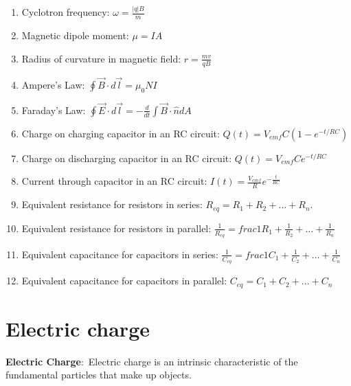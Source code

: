 \documentclass[nobib]{tufte-handout}
\newcommand{\defn}[2]{\noindent\textbf{#1}:\ #2}
\begin{document}
\begin{enumerate}
    \item Cyclotron frequency: $\omega = \frac{|q|B}{m}$
    \item Magnetic dipole moment: $\mu = IA$
    \item Radius of curvature in magnetic field: $r = \frac{mv}{qB}$
    \item Ampere's Law: $\oint \vec{B} \cdot d\vec{l} = \mu_0 NI$
    \item Faraday's Law: $\oint \vec{E} \cdot d\vec{l} = -\frac{d}{dt} \int \vec{B} \cdot \hat{n} dA$
    \item Charge on charging capacitor in an RC circuit: $Q(t) = V_{emf} C (1-e^{-t/RC})$
    \item Charge on discharging capacitor in an RC circuit: $Q(t) = V_{emf} C e^{-t/RC}$
    \item Current through capacitor in an RC circuit: $I(t) = \frac{V_{emf}}{R}e^{-\frac{t}{RC}}$
    \item Equivalent resistance for resistors in series: $R_{eq} = R_1 + R_2 + \dots + R_n$. 
    \item Equivalent resistance for resistors in parallel: $\frac{1}{R_{eq}} =frac{1}{R_1} + \frac{1}{R_2} + \dots + \frac{1}{R_n}$
    \item Equivalent capacitance for capacitors in series: $\frac{1}{C_{eq}} =frac{1}{C_1} + \frac{1}{C_2} + \dots + \frac{1}{C_n}$
    \item Equivalent capacitance for capacitors in parallel: $C_{eq} = C_1 + C_2 + \dots + C_n$
\end{enumerate}

\pagebreak

\pagebreak 

\section{Electric charge}

\defn{Electric Charge}{Electric charge is an intrinsic characteristic of the
fundamental particles that make up objects.}

\end{document}
